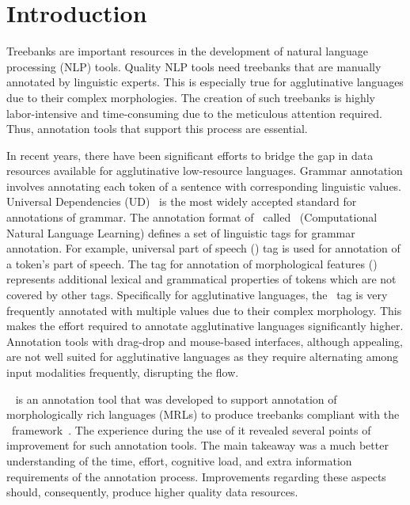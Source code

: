 \section{Introduction}
\label{sec:introduction}

Treebanks are important resources in the development of natural language processing (NLP) tools.
Quality NLP tools need treebanks that are manually annotated by linguistic experts.
This is especially true for agglutinative languages due to their complex morphologies.
The creation of such treebanks is highly labor-intensive and time-consuming due to the meticulous attention required.
Thus, annotation tools that support this process are essential.

In recent years, there have been significant efforts to bridge the gap in data resources available for agglutinative low-resource languages.
Grammar annotation involves annotating each token of a sentence with corresponding linguistic values.
Universal Dependencies (UD)~\cite{UD} is the most widely accepted standard for annotations of grammar.
The annotation format of \ud\ called \conllu\ (Computational Natural Language Learning) defines a set of linguistic tags for grammar annotation.
For example, universal part of speech (\upos) tag is used for annotation of a token's part of speech.
The tag for annotation of morphological features (\feats) represents additional lexical and grammatical properties of tokens which are not covered by other tags.
Specifically for agglutinative languages, the \feats\ tag is very frequently annotated with multiple values due to their complex morphology.
This makes the effort required to annotate agglutinative languages significantly higher.
Annotation tools with drag-drop and mouse-based interfaces, although appealing, are not well suited for agglutinative languages as they require alternating among input modalities frequently, disrupting the flow.

\boatvone~\cite{turk2021resources} is an annotation tool that was developed to support annotation of morphologically rich languages (MRLs) to produce treebanks compliant with the \ud\ framework~\cite{UD}.
The experience during the use of it revealed several points of improvement for such annotation tools.
The main takeaway was a much better understanding of the time, effort, cognitive load, and extra information requirements of the annotation process.
Improvements regarding these aspects should, consequently, produce higher quality data resources.

